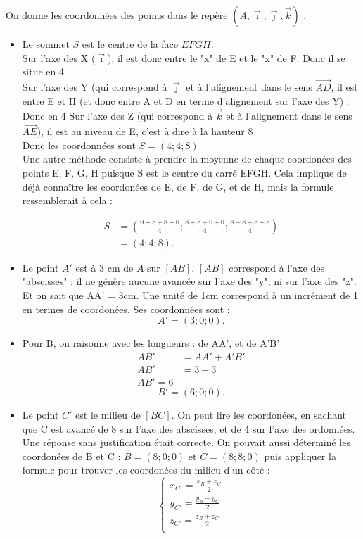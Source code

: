 \documentclass{exam}
\begin{document}
On donne les coordonnées des points dans le repère \((A, \vec{\imath}, \vec{\jmath}, \vec{k})\) :
\begin{itemize}[noitemsep]
  \item Le sommet \(S\) est le centre de la face \(EFGH\). \\ 
  Sur l'axe des X ($\vec{\imath}$), il est donc entre le "x" de E et le "x" de F. Donc il se situe en 4 \\
  Sur l'axe des Y (qui correspond à $\vec{\jmath}$ et à l'alignement dans le sens $\overrightarrow{AD}$, il est entre E et H (et donc entre A et D en terme d'alignement sur l'axe des Y) : Donc en 4
  Sur l'axe des Z (qui correspond à $\vec{k}$ et à l'alignement dans le sens $\overrightarrow{AE}$), il est au niveau de E, c'est à dire à la hauteur 8 \\
  Donc les coordonnées sont $S = (4; 4; 8)$ \\
  Une autre méthode consiste à prendre la moyenne de chaque coordonées des points E, F, G, H puisque S est le centre du carré EFGH. Cela implique de déjà connaître les coordonées de E, de F, de G, et de H, mais la formule ressemblerait à cela : 
  
  \begin{align}
    S &= \left(\frac{0 + 8 + 8 + 0}{4}; \frac{8 + 8 + 0 + 0}{4}; \frac{8 + 8 + 8 + 8}{4}\right) \\
      &= (4; 4; 8).
    \end{align}
  
  \item Le point \(A'\) est à 3 cm de \(A\) sur \([AB]\). \([AB]\) correspond à l'axe des "abscisses" : il ne génère aucune avancée sur l'axe des "y", ni sur l'axe des "z". Et on sait que AA' = 3cm. Une unité de 1cm correspond à un incrément de 1 en termes de coordonées. Ses coordonnées sont :
  \[
  A' = (3; 0; 0).
  \]

  \item Pour B, on raisonne avec les longueurs : de AA', et de A'B'
  \begin{align*}
    AB' &= AA' + A'B' \\
    AB' &= 3 + 3 \\
    AB' = 6
    \end{align*} 
  \[
  B' = (6; 0; 0).
  \]

  \item Le point \(C'\) est le milieu de \([BC]\). On peut lire les coordonées, en sachant que C est avancé de 8 sur l'axe des abscisses, et de 4 sur l'axe des ordonnées. Une réponse sans justification était correcte. On pouvait aussi déterminé les coordonées de B et C : $B = (8;0;0)$ et $C = (8;8;0)$ puis appliquer la formule pour trouver les coordonées du milieu d'un côté : \\
  \[
    \left\{
    \begin{array}{l}
        x_{C'} = \frac{x_B + x_C}{2} \\
        y_{C'} = \frac{y_B + y_C}{2} \\
        z_{C'} = \frac{z_B + z_C}{2} \\
    \end{array}
    \right.
    \]
  

\end{itemize}
\end{document}

